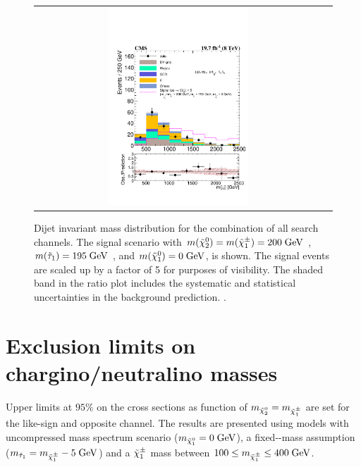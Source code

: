 \begin{figure}[tbh!]
	\centering
	\begin{tabular}{cc}
		\includegraphics[width=0.50\textwidth]{PLOTS/CMS-SUS-14-005_Figure_005.pdf}
	\end{tabular}
	\caption{Dijet invariant mass distribution for the combination of all search channels. The signal scenario with $m(\tilde{\chi}^{0}_{2})= m(\tilde{\chi}^{\pm}_{1}) =  200\;\text{Ge}\kern-0.06667em\text{V}$ , $m(\tilde{\tau}_{1})= 195\;\text{Ge}\kern-0.06667em\text{V}$ , and $m(\tilde{\chi}^{0}_{1}) = 0\;\text{Ge}\kern-0.06667em\text{V}$, is shown. The signal events are scaled up by a factor of 5 for purposes of visibility. The shaded band in the ratio plot includes the systematic and statistical uncertainties in the background prediction. \cite{Khachatryan:2015kxa}.}
	\label{fig::mjj_combined_allchannels}
\end{figure} 

\clearpage

\section{Exclusion limits on chargino/neutralino masses}
\FloatBarrier

Upper limits at $95\%$ on the cross sections as function of $m_{\tilde{\chi}^{0}_{2}}=m_{\tilde{\chi}^{\pm}_{1}}$ are set for the \hadtau\hadtau like-sign and opposite channel. The results are presented using models with uncompressed mass spectrum scenario ($m_{\tilde{\chi}^{0}_{1}} = 0\;\text{Ge}\kern-0.06667em\text{V}$), a fixed-\stau-mass assumption ($m_{\tilde{\tau}_{1}} =  m_{\tilde{\chi}^{\pm}_{1}} - 5\;\text{Ge}\kern-0.06667em\text{V}$) and
a $\tilde{\chi}^{\pm}_{1}$ mass between $100 \leq m_{\tilde{\chi}^{\pm}_{1}} \leq 400\;\text{Ge}\kern-0.06667em\text{V}$.

